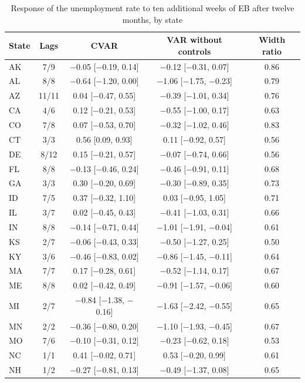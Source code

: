 \begin{table}[htbp]
\centering
\caption{Response of the unemployment rate to ten additional weeks of EB after twelve months, by state\label{tab:eb-states}}
\small
\begin{tabular}{lcccc}
\toprule
State & Lags & CVAR & VAR without controls & Width ratio \\
\midrule
AK & 7/9 & $-$0.05 [$-$0.19, 0.14] & $-$0.12 [$-$0.31, 0.07] & 0.86 \\
AL & 8/8 & $-$0.64 [$-$1.20, 0.00] & $-$1.06 [$-$1.75, $-$0.23] & 0.79 \\
AZ & 11/11 & 0.04 [$-$0.47, 0.55] & $-$0.39 [$-$1.01, 0.34] & 0.76 \\
CA & 4/6 & 0.12 [$-$0.21, 0.53] & $-$0.55 [$-$1.00, 0.17] & 0.63 \\
CO & 7/8 & 0.07 [$-$0.53, 0.70] & $-$0.32 [$-$1.02, 0.46] & 0.83 \\
CT & 3/3 & 0.56 [0.09, 0.93] & 0.11 [$-$0.92, 0.57] & 0.56 \\
DE & 8/12 & 0.15 [$-$0.21, 0.57] & $-$0.07 [$-$0.74, 0.66] & 0.56 \\
FL & 8/8 & $-$0.13 [$-$0.46, 0.24] & $-$0.46 [$-$0.91, 0.11] & 0.68 \\
GA & 3/3 & 0.30 [$-$0.20, 0.69] & $-$0.30 [$-$0.89, 0.35] & 0.73 \\
ID & 7/5 & 0.37 [$-$0.32, 1.10] & 0.03 [$-$0.95, 1.05] & 0.71 \\
IL & 3/7 & 0.02 [$-$0.45, 0.43] & $-$0.41 [$-$1.03, 0.31] & 0.66 \\
IN & 8/8 & $-$0.14 [$-$0.71, 0.44] & $-$1.01 [$-$1.91, $-$0.04] & 0.61 \\
KS & 2/7 & $-$0.06 [$-$0.43, 0.33] & $-$0.50 [$-$1.27, 0.25] & 0.50 \\
KY & 3/6 & $-$0.46 [$-$0.83, 0.02] & $-$0.86 [$-$1.45, $-$0.11] & 0.64 \\
MA & 7/7 & 0.17 [$-$0.28, 0.61] & $-$0.52 [$-$1.14, 0.17] & 0.67 \\
ME & 8/8 & 0.02 [$-$0.42, 0.49] & $-$0.91 [$-$1.57, $-$0.06] & 0.60 \\
MI & 2/7 & $-$0.84 [$-$1.38, $-$0.16] & $-$1.63 [$-$2.42, $-$0.55] & 0.65 \\
MN & 2/2 & $-$0.36 [$-$0.80, 0.20] & $-$1.10 [$-$1.93, $-$0.45] & 0.67 \\
MO & 7/6 & $-$0.10 [$-$0.31, 0.12] & $-$0.23 [$-$0.62, 0.18] & 0.53 \\
NC & 1/1 & 0.41 [$-$0.02, 0.71] & 0.53 [$-$0.20, 0.99] & 0.61 \\
NH & 1/2 & $-$0.27 [$-$0.81, 0.13] & $-$0.49 [$-$1.37, 0.08] & 0.65 \\

\end{tabular}
\end{table}
